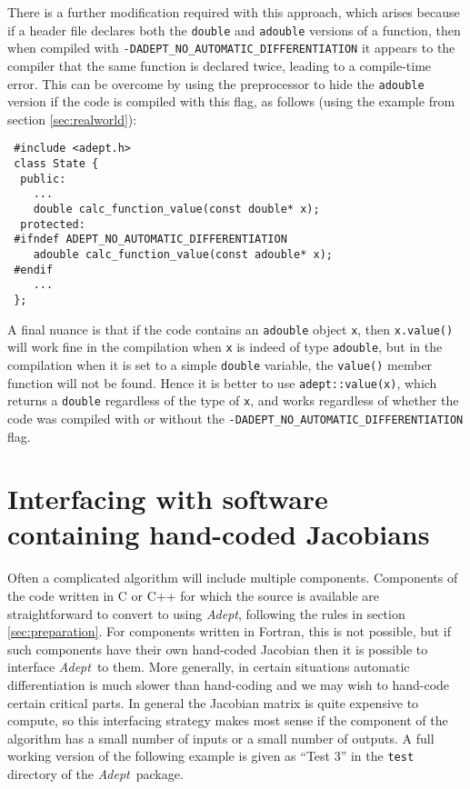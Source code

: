\documentclass[a4,oneside]{book}
\def\codesize{\small}
\def\Adept{\emph{Adept}}
\def\code#1{{\codesize\texttt{#1}}}
\begin{document}
There is a further modification required with this approach, which
arises because if a header file declares both the \code{double} and
\code{adouble} versions of a function, then when compiled with
\code{-DADEPT\_NO\_AUTOMATIC\_DIFFERENTIATION} it appears to the
compiler that the same function is declared twice, leading to a
compile-time error.  This can be overcome by using the preprocessor to
hide the \code{adouble} version if the code is compiled with this
flag, as follows (using the example from section \ref{sec:realworld}):
%
\begin{lstlisting}
 #include <adept.h>
 class State {
  public:
    ...
    double calc_function_value(const double* x);
  protected:
 #ifndef ADEPT_NO_AUTOMATIC_DIFFERENTIATION
    adouble calc_function_value(const adouble* x);
 #endif
    ...
 };
\end{lstlisting}

A final nuance is that if the code contains an \code{adouble} object
\code{x}, then \code{x.value()} will work fine in the compilation when
\code{x} is indeed of type \code{adouble}, but in the compilation when
it is set to a simple \code{double} variable, the \code{value()}
member function will not be found.  Hence it is better to use
\code{adept::value(x)}, which returns a \code{double} regardless of
the type of \code{x}, and works regardless of whether the code was
compiled with or without the
\code{-DADEPT\_NO\_AUTOMATIC\_DIFFERENTIATION} flag.

\section{Interfacing with software containing hand-coded Jacobians}
\label{sec:interfacehandcoded}
Often a complicated algorithm will include multiple components.
Components of the code written in C or C++ for which the source is
available are straightforward to convert to using \Adept, following
the rules in section \ref{sec:preparation}.  For components written in
Fortran, this is not possible, but if such components have their own
hand-coded Jacobian then it is possible to interface \Adept\ to them.
More generally, in certain situations automatic differentiation is
much slower than hand-coding \cite[see the Lax-Wendroff example
  in][]{Hogan2014} and we may wish to hand-code certain critical
parts.  In general the Jacobian matrix is quite expensive to compute,
so this interfacing strategy makes most sense if the component of the
algorithm has a small number of inputs or a small number of
outputs. A full working version of the following example is given as
``Test 3'' in the \code{test} directory of the \Adept\ package.
\end{document}
